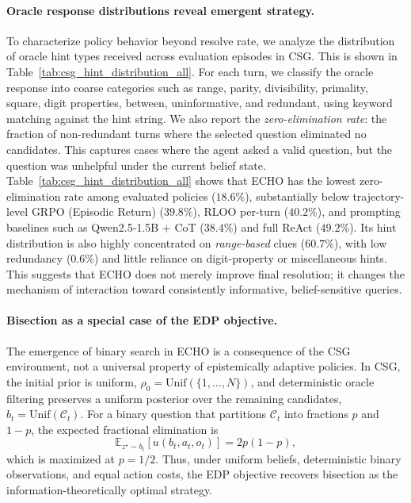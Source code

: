 \documentclass[11pt]{article}
\theoremstyle{plain}
\theoremstyle{definition}
\theoremstyle{remark}
\begin{document}
\paragraph{Oracle response distributions reveal emergent strategy.}
To characterize policy behavior beyond resolve rate, we analyze the distribution of oracle hint types received across evaluation episodes in CSG. This is shown in Table~\ref{tab:csg_hint_distribution_all}. For each turn, we classify the oracle response into coarse categories such as range, parity, divisibility, primality, square, digit properties, between, uninformative, and redundant, using keyword matching against the hint string. We also report the \emph{zero-elimination rate}: the fraction of non-redundant turns where the selected question eliminated no candidates. This captures cases where the agent asked a valid question, but the question was unhelpful under the current belief state. Table~\ref{tab:csg_hint_distribution_all} shows that \textsc{ECHO} has the lowest zero-elimination rate among evaluated policies (\(18.6\%\)), substantially below trajectory-level GRPO (Episodic Return) (\(39.8\%\)), RLOO per-turn (\(40.2\%\)), and prompting baselines such as Qwen2.5-1.5B + CoT (\(38.4\%\)) and full ReAct (\(49.2\%\)). Its hint distribution is also highly concentrated on \textit{range-based} clues (\(60.7\%\)), with low redundancy (\(0.6\%\)) and little reliance on digit-property or miscellaneous hints. This suggests that \textsc{ECHO} does not merely improve final resolution; it changes the mechanism of interaction toward consistently informative, belief-sensitive queries.

\paragraph{Bisection as a special case of the EDP objective.}
The emergence of binary search in \textsc{ECHO} is a consequence of the CSG environment, not a universal property of epistemically adaptive policies. In CSG, the initial prior is uniform, \(\rho_0=\mathrm{Unif}(\{1,\ldots,N\})\), and deterministic oracle filtering preserves a uniform posterior over the remaining candidates, \(b_t=\mathrm{Unif}(\mathcal{C}_t)\). For a binary question that partitions \(\mathcal{C}_t\) into fractions \(p\) and \(1-p\), the expected fractional elimination is
\[
    \mathbb{E}_{z^\star\sim b_t}[u(b_t,a_t,o_t)] = 2p(1-p),
\]
which is maximized at \(p=1/2\). Thus, under uniform beliefs, deterministic binary observations, and equal action costs, the EDP objective recovers bisection as the information-theoretically optimal strategy.
\end{document}

